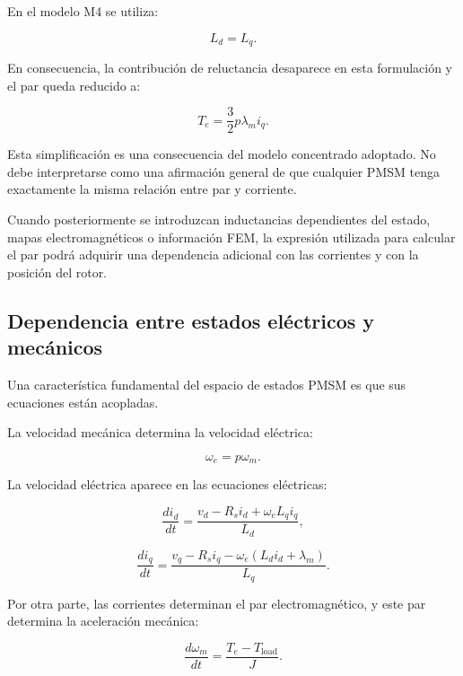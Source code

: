 En el modelo M4 se utiliza:

\begin{equation}
L_d=L_q.
\end{equation}

En consecuencia, la contribución de reluctancia desaparece en esta formulación y el par queda reducido a:

\begin{equation}
T_e
=
\frac{3}{2}p\lambda_mi_q.
\end{equation}

Esta simplificación es una consecuencia del modelo concentrado adoptado. No debe interpretarse como una afirmación general de que cualquier PMSM tenga exactamente la misma relación entre par y corriente.

Cuando posteriormente se introduzcan inductancias dependientes del estado, mapas electromagnéticos o información FEM, la expresión utilizada para calcular el par podrá adquirir una dependencia adicional con las corrientes y con la posición del rotor.

\subsection{Dependencia entre estados eléctricos y mecánicos}

Una característica fundamental del espacio de estados PMSM es que sus ecuaciones están acopladas.

La velocidad mecánica determina la velocidad eléctrica:

\begin{equation}
\omega_e=p\omega_m.
\end{equation}

La velocidad eléctrica aparece en las ecuaciones eléctricas:

\begin{equation}
\frac{di_d}{dt}
=
\frac{
v_d-R_si_d+\omega_eL_qi_q
}{
L_d
},
\end{equation}

\begin{equation}
\frac{di_q}{dt}
=
\frac{
v_q-R_si_q-\omega_e(L_di_d+\lambda_m)
}{
L_q
}.
\end{equation}

Por otra parte, las corrientes determinan el par electromagnético, y este par determina la aceleración mecánica:

\begin{equation}
\frac{d\omega_m}{dt}
=
\frac{
T_e-T_{\mathrm{load}}
}{
J
}.
\end{equation}

